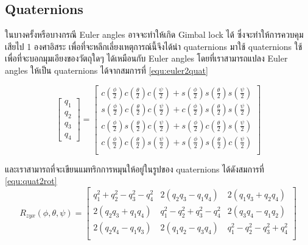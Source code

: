 \clearpage
\subsection{Quaternions}
ในบางครั้งหรือบางกรณี Euler angles อาจจะทำให้เกิด Gimbal lock ได้
ซึ่งจะทำให้การควบคุมเสียไป 1 องศาอิสระ เพื่อที่จะหลีกเลี่ยงเหตุการณ์นี้จึงได้นำ quaternions มาใช้
quaternions ใช้เพื่อที่จะบอกมุมเอียงของวัตถุใดๆ ได้เหมือนกับ Euler angles
โดยที่เราสามารถแปลง Euler angles ให้เป็น quaternions ได้จากสมการที่ \ref{equ:euler2quat}

\begin{equation}
    {\begin{bmatrix} 
    q_1 \\ q_2 \\ q_3 \\ q_4
    \end{bmatrix} = \begin{bmatrix}
        c(\frac{\phi}{2})c(\frac{\theta}{2})c(\frac{\psi}{2})
        + s(\frac{\phi}{2})s(\frac{\theta}{2})s(\frac{\psi}{2}) \\[10pt]
        s(\frac{\phi}{2})c(\frac{\theta}{2})c(\frac{\psi}{2})
        + c(\frac{\phi}{2})s(\frac{\theta}{2})s(\frac{\psi}{2}) \\[10pt]
        c(\frac{\phi}{2})s(\frac{\theta}{2})c(\frac{\psi}{2})
        + s(\frac{\phi}{2})c(\frac{\theta}{2})s(\frac{\psi}{2}) \\[10pt]
        c(\frac{\phi}{2})c(\frac{\theta}{2})s(\frac{\psi}{2})
        + s(\frac{\phi}{2})s(\frac{\theta}{2})c(\frac{\psi}{2}) \\
		\end{bmatrix}}
	\label{equ:euler2quat}
\end{equation}

และเราสามารถที่จะเขียนแมทริกการหมุนให้อยู่ในรูปของ quaternions ได้ดังสมการที่ \ref{equ:quat2rot}
\begin{equation}
    {R_{zyx}(\phi,\theta,\psi) = \begin{bmatrix}
        q_1^2+q_2^2-q_3^2-q_4^2 & 2(q_2q_3-q_1q_4) & 2(q_1q_3+q_2q_4) \\[10pt]
        2(q_2q_3+q_1q_4) & q_1^2-q_2^2+q_3^2-q_4^2 & 2(q_3q_4-q_1q_2) \\[10pt]
        2(q_2q_4-q_1q_3) & 2(q_1q_2-q_3q_4) & q_1^2-q_2^2-q_3^2+q_4^2  \\
       \end{bmatrix}}
	\label{equ:quat2rot}
\end{equation}